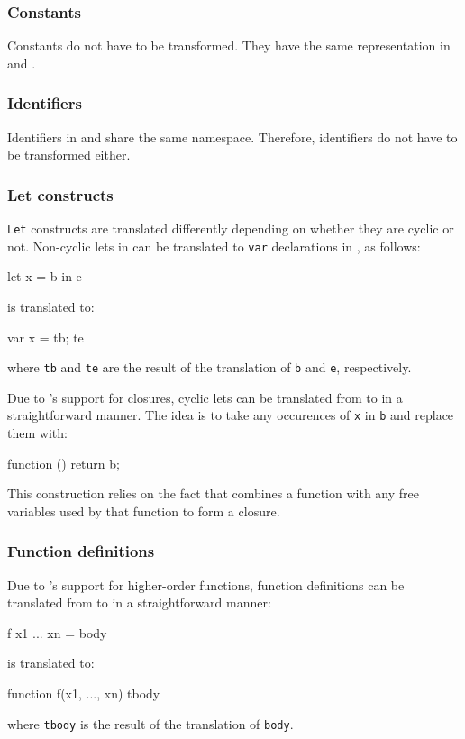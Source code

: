 \subsubsection{Constants}
Constants do not have to be transformed. They have the same representation in
\Sapl and \JS.

\subsubsection{Identifiers}
Identifiers in \Sapl and \JS share the same namespace. Therefore, identifiers do
not have to be transformed either.

\subsubsection{\textsf{Let} constructs} 
\texttt{Let} constructs are translated differently depending on whether they
are cyclic or not. Non-cyclic lets in \Sapl can be translated to \texttt{var}
declarations in \JS, as follows: 
\begin{CleanCode}
let x = b in e
\end{CleanCode}
is translated to:
\begin{CleanCode}
var x = tb; te
\end{CleanCode}
where \texttt{tb} and \texttt{te} are the result of the translation of 
\texttt{b} and \texttt{e}, respectively.

Due to \JS's support for closures, cyclic lets can be translated from \Sapl to
\JS in a straightforward manner. The idea is to take any occurences of 
\texttt{x} in \texttt{b} and replace them with:
\begin{CleanCode}
function () { return b; }
\end{CleanCode}
This construction relies on the fact that \JS combines a function with any free
variables used by that function to form a closure.

\subsubsection{Function definitions} 
Due to \JS's support for higher-order functions, function definitions can be
translated from \Sapl to \JS in a straightforward manner:
\begin{CleanCode}
f x1 ... xn = body
\end{CleanCode}
is translated to:
\begin{CleanCode}
function f(x1, ..., xn) { tbody }
\end{CleanCode}
where \texttt{tbody} is the result of the translation of \texttt{body}.

